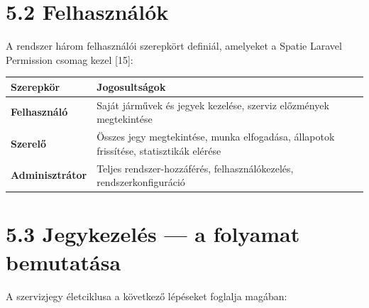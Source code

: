 \section{5.2 Felhasználók}\label{felhasznuxe1luxf3k}

A rendszer három felhasználói szerepkört definiál, amelyeket a Spatie Laravel Permission csomag kezel {[}15{]}:

{\def\LTcaptype{} %
\begin{longtable}[]{@{}
  >{\raggedright\arraybackslash}p{}
  >{\raggedright\arraybackslash}p{}@{}}
\toprule\noalign{}
\begin{minipage}[b]{\linewidth}\raggedright
Szerepkör
\end{minipage} & \begin{minipage}[b]{\linewidth}\raggedright
Jogosultságok
\end{minipage} \\
\midrule\noalign{}
\endhead
\bottomrule\noalign{}
\endlastfoot
\textbf{Felhasználó} & Saját járművek és jegyek kezelése, szerviz előzmények megtekintése \\
\textbf{Szerelő} & Összes jegy megtekintése, munka elfogadása, állapotok frissítése, statisztikák elérése \\
\textbf{Adminisztrátor} & Teljes rendszer-hozzáférés, felhasználókezelés, rendszerkonfiguráció \\
\end{longtable}
}

\section{5.3 Jegykezelés --- a folyamat bemutatása}\label{jegykezeluxe9s-a-folyamat-bemutatuxe1sa}

A szervizjegy életciklusa a következő lépéseket foglalja magában:

